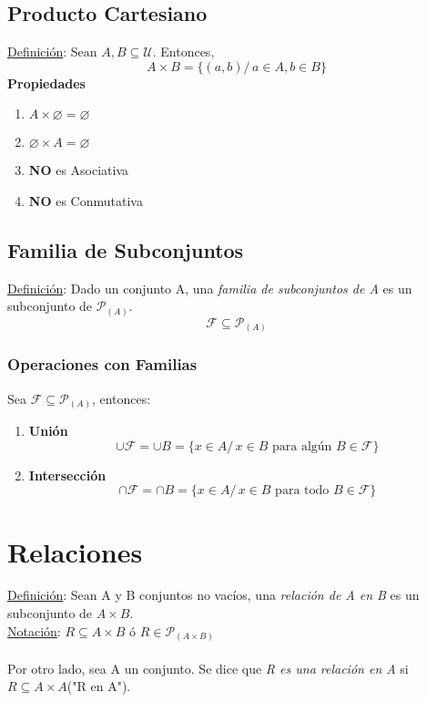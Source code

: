 \documentclass{article}
\newcommand{\tq}{/\,}                                   %
\begin{document}
\subsection{Producto Cartesiano}
\underline{Definición}: Sean $A, B \subseteq \mathcal{U}$. Entonces,
\begin{equation*}
    A \times B = \{ (a,b)\tq a \in A, b \in B\}
\end{equation*}
\textbf{Propiedades}
\begin{enumerate}
    \item $A \times \varnothing = \varnothing$
    \item $\varnothing \times A = \varnothing$
    \item \textbf{NO} es Asociativa
    \item \textbf{NO} es Conmutativa 
\end{enumerate}

\subsection{Familia de Subconjuntos}
\underline{Definición}: Dado un conjunto A, una \emph{familia de subconjuntos de A} es un subconjunto
de $\mathcal{P}_{(A)}$. 
\begin{equation*}
    \mathcal{F} \subseteq \mathcal{P}_{(A)}
\end{equation*}
\subsubsection{Operaciones con Familias}
    Sea $\mathcal{F} \subseteq \mathcal{P}_{(A)}$, entonces:
\begin{enumerate}
    \item \textbf{Unión}
    \begin{equation*}
        \cup \mathcal{F} = \cup B = \{x \in A \tq x \in B \text{ para algún } B \in \mathcal{F}\}
    \end{equation*}
    \item \textbf{Intersección}
    \begin{equation*}
        \cap \mathcal{F} = \cap B = \{x \in A\tq x \in B \text{ para todo } B \in \mathcal{F}\}
    \end{equation*}
\end{enumerate}

\section{Relaciones}
\underline{Definición}: Sean A y B conjuntos no vacíos, una \emph{relación de A en B} es un subconjunto de $A \times B$.
\\\underline{Notación}: $R \subseteq A \times B \text{ ó } R \in \mathcal{P}_{(A \times B)}$
\\\\Por otro lado, sea A un conjunto. Se dice que \emph{R es una relación en A} si $R \subseteq A \times A$("R en A").
\end{document}

